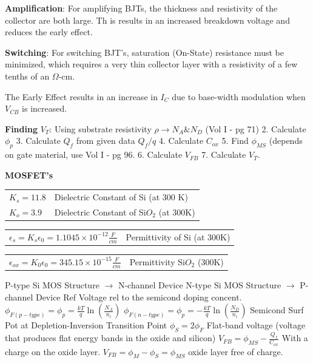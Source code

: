 \begin{multicols}{3}
\textbf{Amplification}: For amplifying BJTs, the thickness and resistivity of the collector are both large.  Th
is results in an increased breakdown voltage and reduces the early effect. \hfill \break

\textbf{Switching}: For switching BJT's, saturation (On-State) resistance must be minimized, which requires a very thin collector layer with a resistivity of a few tenths of an $\Omega$-cm. 

The Early Effect results in an increase in $I_C$ due to base-width modulation when $V_{CB}$ is increased. 

\textbf{Finding} $V_T$: Using substrate resistivity $\rho \rightarrow N_A \& N_D$ (Vol I - pg 71) 2. Calculate $\phi_p$ 3. Calculate $Q_f$ from given data $Q_f/q$ 4. Calculate $C_{ox} $ 5. Find $\phi_{MS}$ (depends on gate material, use Vol I - pg 96.
6. Calculate $V_{FB}$
7. Calculate $V_T$.

\textbf{MOSFET's} \hfill \break 
\begin{tabular}{p{1.8cm}p{7cm}}
$K_s=11.8$ & Dielectric Constant of Si (at 300 K) \\
$K_o=3.9$  & Dielectric Constant of Si$O_2$ (at 300K) \\ 
\end{tabular}
\begin{tabular}{p{4.6cm}p{4.2cm}}
$\epsilon_s=K_s\epsilon_0=1.1045 \times 10^{-12}\frac{F}{cm}$ & Permittivity of Si (at 300K) \\
\end{tabular}
\begin{tabular}{p{4.8cm}p{4.2cm}}
$\epsilon_{ox}=K_0\epsilon_0=345.15 \times 10^{-15}\frac{F}{cm}$  & Permittivity Si$O_2$ (300K) \\ 
\end{tabular}
P-type Si MOS Structure $\rightarrow$ N-channel Device \hfill \break 
N-type Si MOS Structure $\rightarrow$ P-channel Device \hfill \break
Ref Voltage rel to the semicond doping concent.
$\phi_{F(p-type)}= \phi_p = \frac{kT}{q}\ln\left(\frac{N_A}{n_i}\right)$ \hfill \break 
$\phi_{F(n-type)}= \phi_p = - \frac{kT}{q}\ln\left(\frac{N_D}{n_i}\right)$ Semicond Surf Pot at Depletion-Inversion Transition
Point 
$\phi_S = 2 \phi_F$ \hfill \break 
%
%
Flat-band voltage (voltage that produces flat energy bands in the oxide and silicon) \hfill \break 
$V_{FB} = \phi_{MS}-\frac{Q_f}{C_{ox}}$ With a charge on the oxide layer.
$V_{FB}=\phi_M-\phi_S=\phi_{MS}$ oxide layer free of charge.


\end{multicols}
